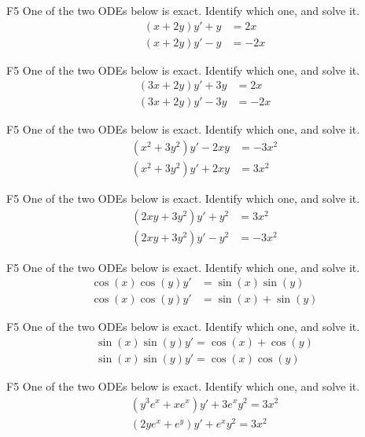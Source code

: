 

\begin{problem}{F5}
One of the two ODEs below is exact.  Identify which one, and solve it.
\begin{align*}
 (x + 2y)y'+y &=2x \\ %
 (x + 2y)y'-y &=-2x  
\end{align*}
\end{problem}

\begin{problem}{F5}
One of the two ODEs below is exact.  Identify which one, and solve it.
\begin{align*}
(3x + 2y)y'+3y &= 2x \\ %
(3x + 2y)y'-3y &= -2x  
\end{align*}
\end{problem}

\begin{problem}{F5}
One of the two ODEs below is exact.  Identify which one, and solve it.
\begin{align*}
(x^2 + 3y^2)y' -2xy &= -3x^2 \\
(x^2 + 3y^2)y' +2xy &= 3x^2  %
\end{align*}
\end{problem}

\begin{problem}{F5}
One of the two ODEs below is exact.  Identify which one, and solve it.
\begin{align*}
(2xy + 3y^2)y' +y^2 &= 3x^2\\ %
(2xy + 3y^2)y' -y^2 &= -3x^2
\end{align*}
\end{problem}

\begin{problem}{F5}
One of the two ODEs below is exact.  Identify which one, and solve it.
\begin{align*}
\cos(x)\cos(y)y' &= \sin(x)\sin(y) \\ %
\cos(x)\cos(y)y' &= \sin(x)+\sin(y)
\end{align*}
\end{problem}

\begin{problem}{F5}
One of the two ODEs below is exact.  Identify which one, and solve it.
\begin{align*}
\sin(x)\sin(y)y' = \cos(x)+\cos(y) \\
\sin(x)\sin(y)y' = \cos(x)\cos(y)  %
\end{align*}
\end{problem}

\begin{problem}{F5}
One of the two ODEs below is exact.  Identify which one, and solve it.
\begin{align*}
(y^3e^x+xe^x)y' +3e^xy^2 = 3x^2\\
(2ye^x+e^y)y' +e^xy^2 = 3x^2 %
\end{align*}
\end{problem}


